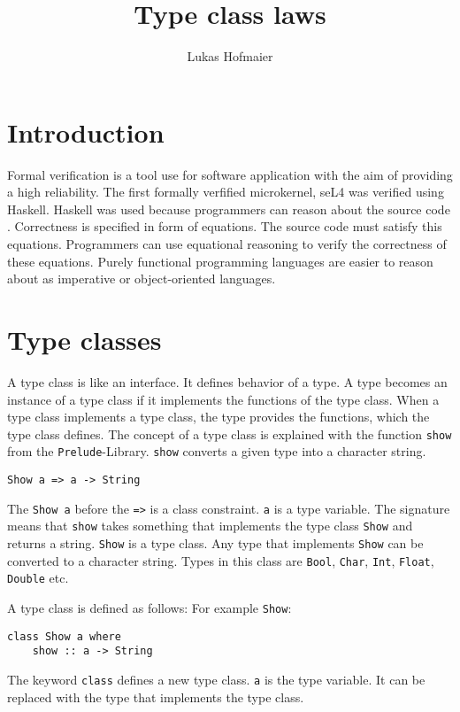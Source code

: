 \documentclass[twoside, a4paper]{article}
\author{Lukas Hofmaier}
\title{Type class laws}
\begin{document}
\maketitle
\tableofcontents

\section{Introduction}
\label{sec:intro}

Formal verification is a tool use for software application with the aim of providing a high reliability. The first formally verfified microkernel, seL4 was verified using Haskell. Haskell was used because programmers can reason about the source code \cite{Klein09}. Correctness is specified in form of equations. The source code must satisfy this equations. Programmers can use equational reasoning to verify the correctness of these equations.
Purely functional programming languages are easier to reason about as imperative or object-oriented languages.

\section{Type classes}
\label{sec:typeclasses}

A type class is like an interface. It defines behavior of a type. A type becomes an instance of a type class if it implements the functions of the type class. When a type class implements a type class, the type provides the functions, which the type class defines.
The concept of a type class is explained with the function \verb|show| from the \verb|Prelude|-Library. \verb|show| converts a given type into a character string.
\begin{verbatim}
Show a => a -> String
\end{verbatim}
The \verb|Show a| before the \verb|=>| is a class constraint. \verb|a| is a type variable. The signature means that \verb|show| takes something that implements the type class \verb|Show| and returns a string. \verb|Show| is a type class. 
Any type that implements \verb|Show| can be converted to a character string. Types in this class are \verb|Bool|, \verb|Char|, \verb|Int|, \verb|Float|, \verb|Double| etc.

A type class is defined as follows: For example \verb|Show|:
\begin{verbatim}
class Show a where
    show :: a -> String
\end{verbatim}
The keyword \verb|class| defines a new type class. \verb|a| is the type variable. It can be replaced with the type that implements the type class.
\end{document}
